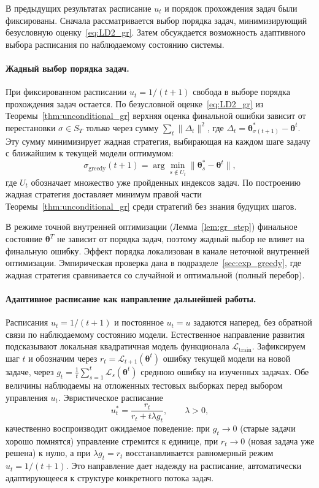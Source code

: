 \documentclass[a4paper,14pt,oneside,openany]{extarticle}
\newcommand{\cL}{\mathcal{L}}
\newcommand{\btheta}{\boldsymbol{\theta}}
\begin{document}
В предыдущих результатах расписание $u_t$ и порядок прохождения задач были фиксированы. Сначала рассматривается выбор порядка задач, минимизирующий безусловную оценку~\eqref{eq:LD2_gr}. Затем обсуждается возможность адаптивного выбора расписания по наблюдаемому состоянию системы.

\paragraph{Жадный выбор порядка задач.}
При фиксированном расписании $u_t = 1/(t+1)$ свобода в выборе порядка прохождения задач остается. По безусловной оценке~\eqref{eq:LD2_gr} из Теоремы~\ref{thm:unconditional_gr} верхняя оценка финальной ошибки зависит от перестановки $\sigma \in S_T$ только через сумму $\sum_t \|\Delta_t\|^2$, где $\Delta_t = \btheta^*_{\sigma(t+1)} - \btheta^t$. Эту сумму минимизирует жадная стратегия, выбирающая на каждом шаге задачу с ближайшим к текущей модели оптимумом:
\[
    \sigma_{\text{greedy}}(t+1) = \arg\min_{s \notin U_t} \|\btheta^*_s - \btheta^t\|,
\]
где $U_t$ обозначает множество уже пройденных индексов задач. По построению жадная стратегия доставляет минимум правой части Теоремы~\ref{thm:unconditional_gr} среди стратегий без знания будущих шагов.

В режиме точной внутренней оптимизации (Лемма~\ref{lem:gr_step}) финальное состояние $\btheta^T$ не зависит от порядка задач, поэтому жадный выбор не влияет на финальную ошибку. Эффект порядка локализован в канале неточной внутренней оптимизации. Эмпирическая проверка дана в подразделе~\ref{sec:exp_greedy}, где жадная стратегия сравнивается со случайной и оптимальной (полный перебор).

\paragraph{Адаптивное расписание как направление дальнейшей работы.}
Расписания $u_t = 1/(t+1)$ и постоянное $u_t = u$ задаются наперед, без обратной связи по наблюдаемому состоянию модели. Естественное направление развития подсказывают локальная квадратичная модель функционала $\cL_{\text{train}}$. Зафиксируем шаг $t$ и обозначим через $r_t = \cL_{t+1}(\btheta^t)$ ошибку текущей модели на новой задаче, через $g_t = \tfrac{1}{t}\sum_{s=1}^t \cL_s(\btheta^t)$ среднюю ошибку на изученных задачах. Обе величины наблюдаемы на отложенных тестовых выборках перед выбором управления $u_t$. Эвристическое расписание
\begin{equation}
    u_t^* = \frac{r_t}{r_t + t \lambda g_t}, \qquad \lambda > 0,
    \label{eq:adaptive_u}
\end{equation}
качественно воспроизводит ожидаемое поведение: при $g_t \to 0$ (старые задачи хорошо помнятся) управление стремится к единице, при $r_t \to 0$ (новая задача уже решена) к нулю, а при $\lambda g_t = r_t$ восстанавливается равномерный режим $u_t = 1/(t+1)$. Это направление дает надежду на расписание, автоматически адаптирующееся к структуре конкретного потока задач.
\end{document}
